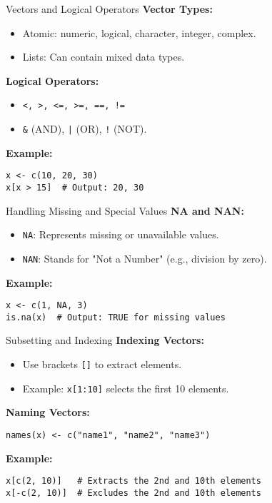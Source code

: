 \documentclass{beamer}
\begin{document}
\begin{frame}[fragile]{Vectors and Logical Operators}
\textbf{Vector Types:}
\begin{itemize}
    \item Atomic: numeric, logical, character, integer, complex.
    \item Lists: Can contain mixed data types.
\end{itemize}
\textbf{Logical Operators:}
\begin{itemize}
    \item \texttt{<, >, <=, >=, ==, !=}
    \item \texttt{\&} (AND), \texttt{|} (OR), \texttt{!} (NOT).
\end{itemize}
\textbf{Example:}
\begin{verbatim}
x <- c(10, 20, 30)
x[x > 15]  # Output: 20, 30
\end{verbatim}
\end{frame}


\begin{frame}[fragile]{Handling Missing and Special Values}
\textbf{NA and NAN:}
\begin{itemize}
    \item \texttt{NA}: Represents missing or unavailable values.
    \item \texttt{NAN}: Stands for "Not a Number" (e.g., division by zero).
\end{itemize}
\textbf{Example:}
\begin{verbatim}
x <- c(1, NA, 3)
is.na(x)  # Output: TRUE for missing values
\end{verbatim}
\end{frame}

\begin{frame}[fragile]{Subsetting and Indexing}
\textbf{Indexing Vectors:}
\begin{itemize}
    \item Use brackets \texttt{[]} to extract elements.
    \item Example: \texttt{x[1:10]} selects the first 10 elements.
\end{itemize}
\textbf{Naming Vectors:}
\begin{verbatim}
names(x) <- c("name1", "name2", "name3")
\end{verbatim}
\textbf{Example:}
\begin{verbatim}
x[c(2, 10)]   # Extracts the 2nd and 10th elements
x[-c(2, 10)]  # Excludes the 2nd and 10th elements
\end{verbatim}
\end{frame}
\end{document}
